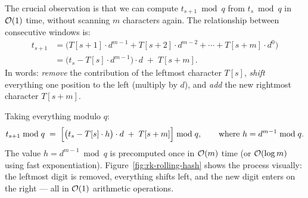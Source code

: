 The crucial observation is that we can compute $t_{s+1} \bmod q$ from
$t_s \bmod q$ in $\mathcal{O}\!\left(1\right)$ time, without scanning $m$ characters again.
The relationship between consecutive windows is:
\begin{align*}
  t_{s+1}
  &= \bigl(T[s+1]\cdot d^{m-1} + T[s+2]\cdot d^{m-2} + \cdots
     + T[s+m]\cdot d^{0}\bigr) \\
  &= \bigl(t_s - T[s]\cdot d^{m-1}\bigr)\cdot d \;+\; T[s+m].
\end{align*}
In words: \emph{remove} the contribution of the leftmost character
$T[s]$, \emph{shift} everything one position to the left (multiply by
$d$), and \emph{add} the new rightmost character $T[s+m]$.

Taking everything modulo $q$:
\[
  t_{s+1} \bmod q
  \;=\;
  \Bigl[\bigl(t_s - T[s]\cdot h\bigr)\cdot d \;+\; T[s+m]\Bigr] \bmod q,
  \qquad
  \text{where } h = d^{m-1} \bmod q.
\]
The value $h = d^{m-1} \bmod q$ is precomputed once in $\mathcal{O}\!\left(m\right)$ time (or
$\mathcal{O}\!\left(\log m\right)$ using fast exponentiation).
Figure~\ref{fig:rk-rolling-hash} shows the process visually: the
leftmost digit is removed, everything shifts left, and the new digit
enters on the right --- all in $\mathcal{O}\!\left(1\right)$ arithmetic operations.

